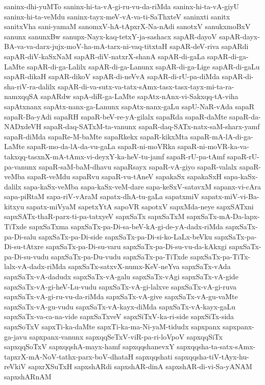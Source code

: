 {saninx-dhi-yuMTo
saninx-hi-ta-vA-gi-ru-vu-da-riMda
saninx-hi-ta-vA-giyU
saninx-hi-ta-veMdu
saninx-tayx-meV-vA-va-ti-SaThxteV
saninxti
sanitx
sanitxVha
sani-yamaM
sanomxV-hA-tApxrX-Na-nAdi
sanotxV
sanukxmoBxV
sanunx
sanunxBw
sanupx-Nayx-kaq-tetxY-ja-sashacx
sapAR-dayoV
sapAR-dayx-BA-va-va-darx-jujx-moV-ha-mA-tarx-ni-vaq-titxtaH
sapAR-deV-riva
sapARdi
sapAR-diV-kaSxNaM
sapAR-diV-natxrX-shanA
sapAR-di-gaLa
sapAR-di-ga-LaMte
sapAR-di-ga-Lalilx
sapAR-di-ga-Lanunx
sapAR-di-ga-Lige
sapAR-di-gaLu
sapAR-dikaH
sapAR-dikoV
sapAR-di-neVvA
sapAR-di-rU-pa-diMda
sapAR-di-sha-riV-ra-dalilx
sapAR-di-va-sutx-va-tatx-sAmx-tasx-tasx-tayx-mi-ta-ra-namxqqSA
sapARdw
sapA-diR-ga-LaMte
sapAtx-nAnx-vi-Sakxqq-tA-viha
sapAtxnanx
sapAtx-nanx-ga-Lanunx
sapAtx-nanx-gaLu
sapU-NaR-vAda
sapaR
sapaR-Ba-yAdi
sapaRH
sapaR-beV-re-yA-gilalx
sapaRda
sapaR-daMte
sapaR-da-NADxdeVH
sapaR-daq-SATxM-ta-vanunx
sapaR-daq-SATx-natx-saM-sharx-yamf
sapaR-diMda
sapaRe-M-baMte
sapaRkekx
sapaR-kikxMta
sapaR-mA-lA-di-ga-LaMte
sapaR-mo-da-lA-da-vu-gaLa
sapaR-ni-moVRka
sapaR-ni-moVR-ka-va-takxqq-tasxnX-mA-tAmx-vi-deyxY-ka-heV-tu-jamf
sapaR-rU-pa-tAmf
sapaR-rU-pa-vanunx
sapaR-saM-baM-dhavu
sapaRsayx
sapaR-vA-giyo
sapaR-valalx
sapaR-veMba
sapaR-veMdu
sapaRvu
sapaR-vu-tAneV
sapakaSx
sapakaSxH
sapa-kaSx-dalilx
sapa-kaSx-veMba
sapa-kaSx-veM-dare
sapa-keSxV-satavxM
sapanx-vi-cAra
sapa-piRtaM
sapa-riV-vAraM
sapatx-dhA-tu-gaLa
sapatxmiV
sapatx-miV-vi-Ba-kitxyu
sapatx-miVyaM
sapetxYtA
sapoVR
sapotxV
sapxMda-neye
sapxSATxni
sapxSATx-thaR-parx-ti-pa-tatxyeV
sapxSaTx
sapxSaTxM
sapxSaTx-mA-Da-lapx-TiTxde
sapxSaTxma
sapxSaTx-pa-Di-sa-beV-kA-gi-de-yA-dadx-riMda
sapxSaTx-pa-Di-salu
sapxSaTx-pa-Di-side
sapxSaTx-pa-Di-si-ko-LaLx-beVku
sapxSaTx-pa-Di-su-tAtxre
sapxSaTx-pa-Di-su-varu
sapxSaTx-pa-Di-su-vu-da-kAkxgi
sapxSaTx-pa-Di-su-vudu
sapxSaTx-pa-Du-vudu
sapxSaTx-pa-TiTxde
sapxSaTx-pa-TiTx-lalx-vA-dadx-riMda
sapxSaTx-satxvX-numx-KeV-neYva
sapxSaTx-vAda
sapxSaTx-vA-dadudx
sapxSaTx-vA-galu
sapxSaTx-vAgi
sapxSaTx-vA-gide
sapxSaTx-vA-gi-heV-Lu-vudu
sapxSaTx-vA-gi-lalxve
sapxSaTx-vA-gi-ruva
sapxSaTx-vA-gi-ru-vu-da-riMda
sapxSaTx-vA-give
sapxSaTx-vA-gu-vaMte
sapxSaTx-vA-gu-vudu
sapxSaTx-vA-kayx-diMda
sapxSaTx-vA-kayx-gaLu
sapxSaTx-va-ca-na-vide
sapxSaTxveV
sapxSiTxV-ka-ri-side
sapxSiTx-sida
sapxSoTxV
sapxTi-ka-daMte
sapxTi-ka-ma-Ni-yaM-tidudx
sapxpanx
sapxpanx-ga-javu
sapxpanx-vanunx
sapxqqSeTxV-viR-pa-ri-loVpoV
sapxqqSiTx
sapxqqSoTxV
sapxqqshA-mayx-hamf
sapxqqshanevxY
sapxqqsha-ta-satx-sAmx-tapxrX-mA-NoV-tathx-parx-boV-dhataH
sapxqqshati
sapxqqsha-tiV-tAyx-hu-reVkiV
sapxrXSuTxH
sapxshARdi
sapxshAR-dinA
sapxshAR-di-vi-Sa-yANAM
sapxshARnAM
}
